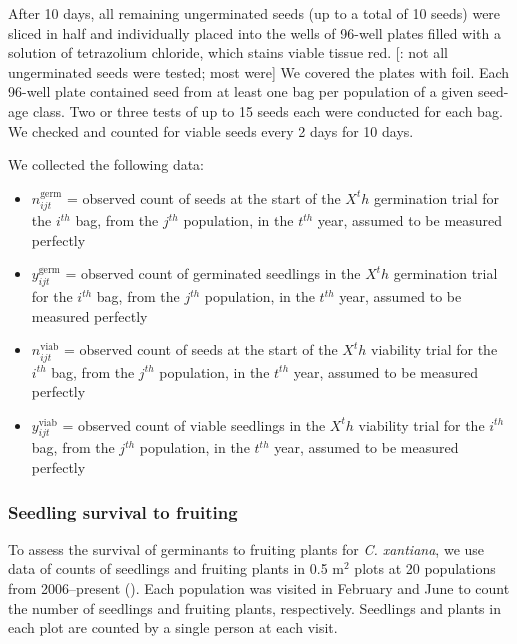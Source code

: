 \documentclass[12pt, oneside, titlepage]{article}   	%
\begin{document}
After 10 days, all remaining ungerminated seeds (up to a total of 10 seeds) were sliced in half and individually placed into the wells of 96-well plates filled with a solution of tetrazolium chloride, which stains viable tissue red. [\cite{eckhart2011}: not all ungerminated seeds were tested; most were] We covered the plates with foil. Each 96-well plate contained seed from at least one bag per population of a given seed-age class. Two or three tests of up to 15 seeds each were conducted for each bag. We checked and counted for viable seeds every 2 days for 10 days. 

We collected the following data: 

\begin{itemize}
	\item $n^{\mathrm{germ}}_{ijt}$ = observed count of seeds at the start of the $X^th$ germination trial for the $i^{th}$ bag, from the $j^{th}$ population, in the $t^{th}$ year, assumed to be measured perfectly
	\item $y^{\mathrm{germ}}_{ijt}$ = observed count of germinated seedlings in the $X^th$ germination trial for the $i^{th}$ bag, from the $j^{th}$ population, in the $t^{th}$ year, assumed to be measured perfectly 
	\item $n^{\mathrm{viab}}_{ijt}$ = observed count of seeds at the start of the $X^th$ viability trial for the $i^{th}$ bag, from the $j^{th}$ population, in the $t^{th}$ year, assumed to be measured perfectly 
	\item $y^{\mathrm{viab}}_{ijt}$ = observed count of viable seedlings in the $X^th$ viability trial for the $i^{th}$ bag, from the $j^{th}$ population, in the $t^{th}$ year, assumed to be measured perfectly 
\end{itemize}

\subsubsection*{Seedling survival to fruiting}

To assess the survival of germinants to fruiting plants for \textit{C. xantiana}, we use data of counts of seedlings and fruiting plants in 0.5 m$^2$ plots at 20 populations from 2006--present (\cite{eckhart2011}). Each population was visited in February and June to count the number of seedlings and fruiting plants, respectively. Seedlings and plants in each plot are counted by a single person at each visit. 

\end{document}
